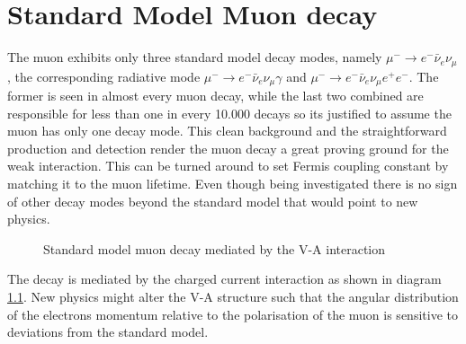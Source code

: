 \chapter{Standard Model Muon decay}
\label{ch:SMMuon}
The muon exhibits only three standard model decay modes, namely $\mu^-\rightarrow e^-\bar{\nu}_e\nu_\mu$, the corresponding radiative mode $\mu^-\rightarrow e^-\bar{\nu}_e\nu_\mu\gamma$ and $\mu^-\rightarrow e^-\bar{\nu}_e\nu_\mu e^+e^-$. The former is seen in almost every muon decay, while the last two combined are responsible for less than one in every 10.000 decays so its justified to assume the muon has only one decay mode. This clean background and the straightforward production and detection render the muon decay a great proving ground for the weak interaction. This can be turned around to set Fermis coupling constant by matching it to the muon lifetime.
Even though being investigated there is no sign of other decay modes beyond the standard model that would point to new physics. 
\begin{figure}[H]
\centering
{}
\caption{Standard model muon decay mediated by the V-A interaction}
\label{fg:SM-Muondecay}
\end{figure}
The decay is mediated by the charged current interaction as shown in diagram \ref{fg:SM-Muondecay}. New physics might alter the V-A structure such that the angular distribution of the electrons momentum relative to the polarisation of the muon is sensitive to deviations from the standard model.  

